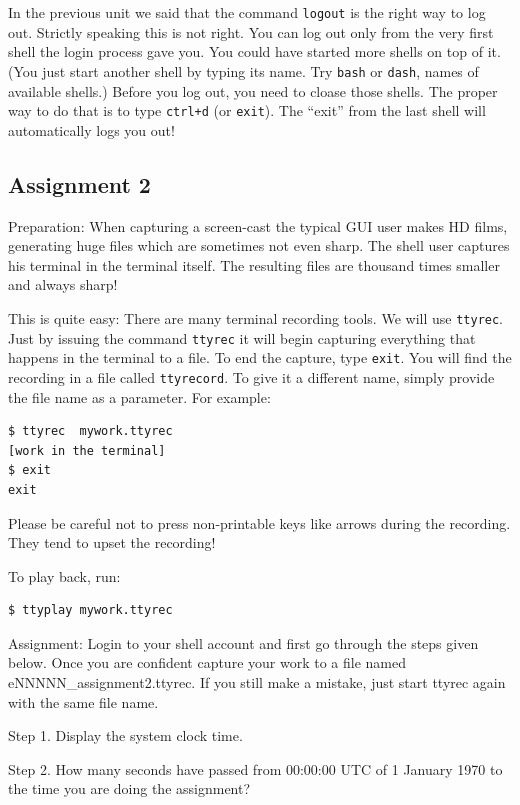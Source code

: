 \documentclass[11pt,a4paper,twoside]{article}
\begin{document}
In the previous unit we said that the command \texttt{logout} is the
right way to log out. Strictly speaking this is not right. You can
log out only from the very first shell the login process gave you.
You could have started more shells on top of it. (You just start
another shell by typing its name. Try \texttt{bash} or \texttt{dash},
names of available shells.) Before you log out, you need to cloase
those shells. The proper way to do that is to type \texttt{ctrl+d}
(or \texttt{exit}). The ``exit'' from the last shell will automatically
logs you out!


\subsection{Assignment 2}

Preparation: When capturing a screen-cast the typical GUI user makes HD 
films, generating huge files which are sometimes not even sharp. The 
shell user captures his terminal in the terminal itself. The resulting 
files are thousand times smaller and always sharp!

This is quite easy: There are many terminal recording tools. We will use 
\texttt{ttyrec}. Just by issuing the command \texttt{ttyrec} it will begin 
capturing everything that happens in the terminal to a file. To end the 
capture, type \texttt{exit}. You will find the recording in a file called 
\texttt{ttyrecord}. To give it a different name, simply provide the file 
name as a parameter.  For example:

\begin{lstlisting}[frame=single]
$ ttyrec  mywork.ttyrec
[work in the terminal]
$ exit
exit
\end{lstlisting}

Please be careful not to press non-printable keys like arrows during the
recording. They tend to upset the recording!

To play back, run:
\begin{lstlisting}[frame=single]
$ ttyplay mywork.ttyrec
\end{lstlisting}

Assignment: Login to your shell account and first go through the steps 
given below. Once you are confident capture your work to a file named 
eNNNNN\_assignment2.ttyrec. If you still make a mistake, just start ttyrec 
again with the same file name.

Step 1. Display the system clock time.

Step 2. How many seconds have passed from 00:00:00 UTC of 1 January 1970 to the
time you are doing the assignment?
\end{document}
